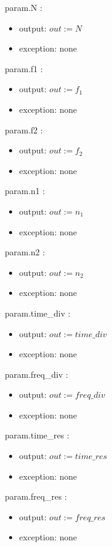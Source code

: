 \documentclass[12pt, titlepage]{article}
\begin{document}
param.N :
\begin{itemize}
\item output: $out := N$
\item exception: none
\end{itemize}

param.f1 :
\begin{itemize}
\item output: $out := f_1$
\item exception: none
\end{itemize}

param.f2 :
\begin{itemize}
\item output: $out := f_2$
\item exception: none
\end{itemize}

param.n1 :
\begin{itemize}
\item output: $out := n_1$
\item exception: none
\end{itemize}

param.n2 :
\begin{itemize}
\item output: $out := n_2$
\item exception: none
\end{itemize}

param.time\_div :
\begin{itemize}
\item output: $out := time\_div$
\item exception: none
\end{itemize}

param.freq\_div :
\begin{itemize}
\item output: $out := freq\_div$
\item exception: none
\end{itemize}

param.time\_res :
\begin{itemize}
\item output: $out := time\_res$
\item exception: none
\end{itemize}

param.freq\_res :
\begin{itemize}
\item output: $out := freq\_res$
\item exception: none
\end{itemize}
\end{document}
